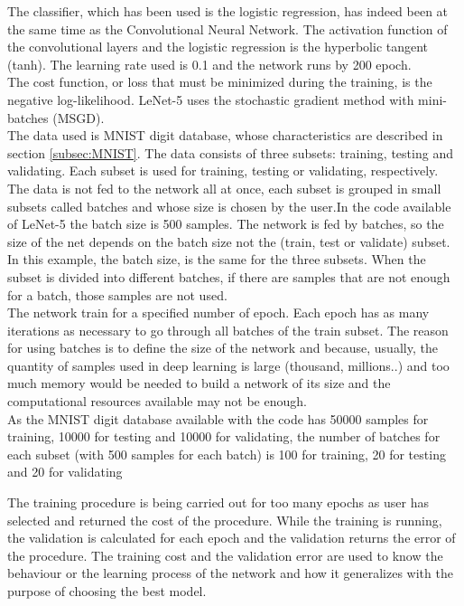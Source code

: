 The classifier, which has been used is the logistic regression, has indeed been at the same time as the Convolutional Neural Network. The activation function of the convolutional layers and the logistic regression is the hyperbolic tangent (tanh). The learning rate used is 0.1 and the network runs by 200 epoch.\\

The cost function, or loss that must be minimized during the training, is the negative log-likelihood. LeNet-5 uses the stochastic gradient method with mini-batches (MSGD).\\

The data used is MNIST digit database, whose characteristics are described in section \ref{subsec:MNIST}. The data consists of three subsets: training, testing and validating. Each subset is used for training, testing or validating, respectively.\\

The data is not fed to the network all at once, each subset is grouped in small subsets called batches and whose size is chosen by the user.In the code available of LeNet-5 the batch size is 500 samples. The network is fed by batches, so the size of the net depends on the batch size not the (train, test or validate) subset. In this example, the batch size, is the same for the three subsets. When the subset is divided into different batches, if there are samples that are not enough for a batch, those samples are not used.\\

The network train for a specified number of epoch. Each epoch has as many iterations as necessary to go through all batches of the train subset. The reason for using batches is to define the size of the network and because, usually, the quantity of samples used in deep learning is large (thousand, millions..) and too much memory would be needed to build a network of its size and the computational resources available may not be enough.\\

As the MNIST digit database available with the code has 50000 samples for training, 10000 for testing and 10000 for validating, the number of batches for each subset (with 500 samples for each batch) is 100 for training, 20 for testing and 20 for validating

The training procedure is being carried out for too many epochs as user has selected and returned the cost of the procedure. While the training is running, the validation is calculated for each epoch and the validation returns the error of the procedure. The training cost and the validation error are used to know the behaviour or the learning process of the network and how it generalizes with the purpose of choosing the best model.\\

